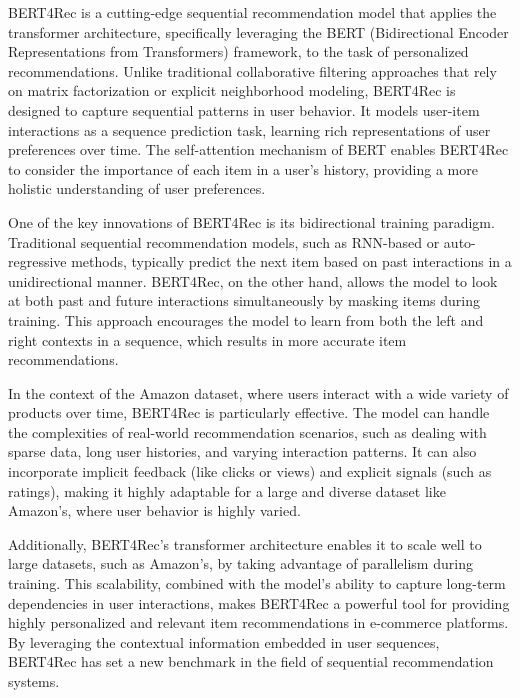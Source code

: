 \documentclass{article}
\begin{document}
BERT4Rec \cite{sun2019bert4rec} is a cutting-edge sequential recommendation model that applies the transformer architecture, specifically leveraging the BERT (Bidirectional Encoder Representations from Transformers) framework, to the task of personalized recommendations. Unlike traditional collaborative filtering approaches that rely on matrix factorization or explicit neighborhood modeling, BERT4Rec is designed to capture sequential patterns in user behavior. It models user-item interactions as a sequence prediction task, learning rich representations of user preferences over time. The self-attention mechanism of BERT enables BERT4Rec to consider the importance of each item in a user's history, providing a more holistic understanding of user preferences.

One of the key innovations of BERT4Rec is its bidirectional training paradigm. Traditional sequential recommendation models, such as RNN-based or auto-regressive methods, typically predict the next item based on past interactions in a unidirectional manner. BERT4Rec, on the other hand, allows the model to look at both past and future interactions simultaneously by masking items during training. This approach encourages the model to learn from both the left and right contexts in a sequence, which results in more accurate item recommendations.

In the context of the Amazon dataset, where users interact with a wide variety of products over time, BERT4Rec is particularly effective. The model can handle the complexities of real-world recommendation scenarios, such as dealing with sparse data, long user histories, and varying interaction patterns. It can also incorporate implicit feedback (like clicks or views) and explicit signals (such as ratings), making it highly adaptable for a large and diverse dataset like Amazon’s, where user behavior is highly varied.

Additionally, BERT4Rec's transformer architecture enables it to scale well to large datasets, such as Amazon’s, by taking advantage of parallelism during training. This scalability, combined with the model's ability to capture long-term dependencies in user interactions, makes BERT4Rec a powerful tool for providing highly personalized and relevant item recommendations in e-commerce platforms. By leveraging the contextual information embedded in user sequences, BERT4Rec has set a new benchmark in the field of sequential recommendation systems.
\end{document}
